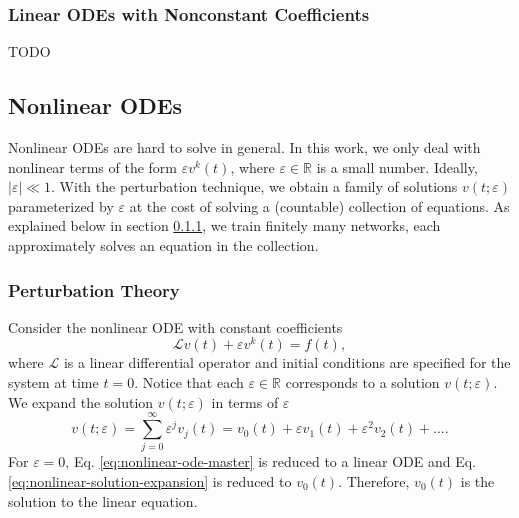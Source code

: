 \documentclass{article}
\renewcommand{\L}{\mathcal{L}}
\begin{document}
\subsubsection{Linear ODEs with Nonconstant Coefficients}
    TODO

\subsection{Nonlinear ODEs}
    Nonlinear ODEs are hard to solve in general. 
    In this work, we only deal with nonlinear terms of the form $\varepsilon v^k(t)$, where $\varepsilon \in \mathbb{R}$ is a small number. 
    Ideally, $|\varepsilon| \ll 1$. 
    With the perturbation technique, we obtain a family of solutions $v(t;\varepsilon)$ parameterized by $\varepsilon$ at the cost of solving a (countable) collection of equations. 
    As explained below in section \ref{section:perturbation-theory}, we train finitely many networks, each approximately solves an equation in the collection.

\subsubsection{Perturbation Theory} \label{section:perturbation-theory}
    Consider the nonlinear ODE with constant coefficients
    \begin{equation} \label{eq:nonlinear-ode-master}
        \L v(t) + \varepsilon v^k(t) = f(t),
    \end{equation}
    where $\L$ is a linear differential operator and initial conditions are specified for the system at time $t=0$. 
    Notice that each $\varepsilon \in \mathbb{R}$ corresponds to a solution $v(t; \varepsilon)$. 
    We expand the solution $v(t; \varepsilon)$ in terms of $\varepsilon$
    \begin{equation} \label{eq:nonlinear-solution-expansion}
        v(t; \varepsilon) = \sum_{j=0}^{\infty} \varepsilon^j v_j(t) = v_0(t) + \varepsilon v_1(t) + \varepsilon^2 v_2(t) + \dots.
    \end{equation}
    For $\varepsilon = 0$, Eq. \ref{eq:nonlinear-ode-master} is reduced to a linear ODE and Eq. \ref{eq:nonlinear-solution-expansion} is reduced to $v_0(t)$. Therefore, $v_0(t)$ is the solution to the linear equation. 
\end{document}
